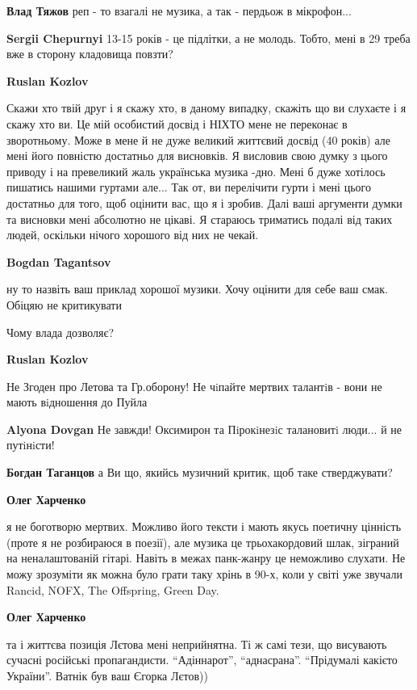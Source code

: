 \begin{itemize}
\begin{itemize}
\textbf{Влад Тяжов} реп - то взагалі не музика, а так - пердьож в мікрофон...

\textbf{Sergii Chepurnyi} 13-15 років - це підлітки, а не молодь. Тобто, мені в 29 треба вже в сторону кладовища повзти?

\textbf{Ruslan Kozlov} 

Скажи хто твій друг і я скажу хто, в даному випадку, скажіть що ви слухаєте і я
скажу хто ви. Це мій особистий досвід і НІХТО мене не переконає в зворотньому.
Може в мене й не дуже великий життєвий досвід (40 років) але мені його повністю
достатньо для висновків. Я висловив свою думку з цього приводу і на превеликий
жаль українська музика -дно. Мені б дуже хотілось пишатись нашими гуртами
але... Так от, ви перелічити гурти і мені цього достатньо для того, щоб
оцінити вас, що я і зробив. Далі ваші аргументи думки та висновки мені
абсолютно не цікаві. Я стараюсь триматись подалі від таких людей, оскільки
нічого хорошого від них не чекай.


\textbf{Bogdan Tagantsov} 

ну то назвіть ваш приклад хорошої музики. Хочу оцінити для себе ваш смак.
Обіцяю не критикувати

Чому влада дозволяє?

\textbf{Ruslan Kozlov} 

Не Згоден про Летова та Гр.оборону! Не чiпайте мертвих талантiв - вони не мають
вiдношення до Пуйла

\textbf{Alyona Dovgan} Не завжди! Оксимирон та Пiрокiнезiс талановитi люди... й не путiнiсти!

\textbf{Богдан Таганцов} а Ви що, якийсь музичний критик, щоб таке стверджувати?

\textbf{Олег Харченко} 

я не боготворю мертвих. Можливо його тексти і мають якусь поетичну цінність
(проте я не розбираюся в поезії), але музика це трьохакордовий шлак, зіграний
на неналаштованій гітарі. Навіть в межах панк-жанру це неможливо слухати. Не
можу зрозуміти як можна було грати таку хрінь в 90-х, коли у світі уже звучали
Rancid, NOFX, The Offspring, Green Day.

\textbf{Олег Харченко} 

та і життєва позиція Лєтова мені неприйнятна. Ті ж самі тези, що висувають
сучасні російські пропагандисти. \enquote{Адіннарот}, \enquote{аднасрана}. \enquote{Прідумалі какієто
України}. Ватнік був ваш Єгорка Лєтов))


\end{itemize}
\end{itemize}
